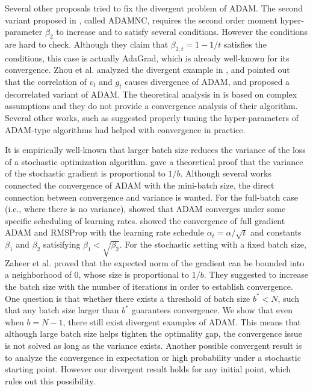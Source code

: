 \documentclass[twoside]{article}
\begin{document}
Several other proposals tried to fix the divergent problem of ADAM. The second variant proposed in \cite{reddi2019convergence}, called ADAMNC, requires the second order moment hyper-parameter $\beta_2$ to increase and to satisfy several conditions. However the conditions are hard to check. Although they claim that $\beta_{2,t}=1-1/t$ satisfies the conditions, this case is actually AdaGrad, which is already well-known for its convergence. Zhou et al. \cite{zhou2018adashift} analyzed the divergent example in \cite{reddi2019convergence}, and pointed out that the correlation of $v_t$ and $g_t$ causes divergence of ADAM, and proposed a decorrelated variant of ADAM. The theoretical analysis in \cite{zhou2018adashift} is based on complex assumptions and they do not provide a convergence analysis of their algorithm. Several other works, such as \cite{guo2021novel, shi2020rmsprop, wang2019sadam, zou2019sufficient} suggested properly tuning the hyper-parameters of ADAM-type algorithms had helped with convergence in practice.

It is empirically well-known that larger batch size reduces the variance of the loss of a stochastic optimization algorithm. \cite{qian2020impact} gave a theoretical proof that the variance of the stochastic gradient is proportional to $1/b$. Although several works connected the convergence of ADAM with the mini-batch size, the direct connection between convergence and variance is wanted. For the full-batch case (i.e., where there is no variance), \cite{de2018convergence} showed that ADAM converges under some specific scheduling of learning rates. \cite{shi2020rmsprop} showed the convergence of full gradient ADAM and RMSProp with the learning rate schedule $\alpha_t = \alpha / \sqrt{t}$ and constants $\beta_1$ and $\beta_2$ satisifying $\beta_1<\sqrt{\beta_2}$. For the stochastic setting with a fixed batch size, Zaheer et al. \cite{zaheer2018adaptive} proved that the expected norm of the gradient can be bounded into a neighborhood of 0, whose size is proportional to $1/b$. They suggested to increase the batch size with the number of iterations in order to establish convergence. One question is that whether there exists a threshold of batch size $b^*<N$, such that any batch size larger than $b^*$ guarantees convergence. We show that even when $b=N-1$, there still exist divergent examples of ADAM. This means that although large batch size helps tighten the optimality gap, the convergence issue is not solved as long as the variance exists. Another possible convergent result is to analyze the convergence in expectation or high probability under a stochastic starting point. However our divergent result holds for any initial point, which rules out this possibility.
\end{document}
